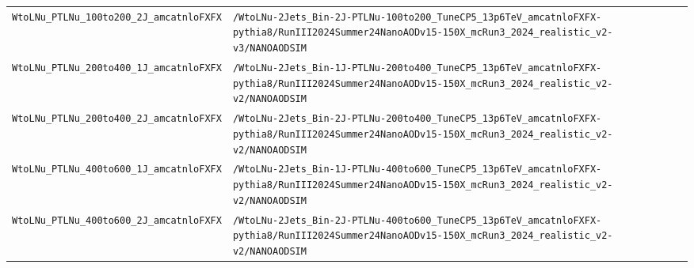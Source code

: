 \begin{longtable}{@{}>{\RaggedRight\arraybackslash}p{} >{\RaggedRight\arraybackslash}p{}@{}}
\addlinespace[2pt]
\texttt{WtoLNu\_\allowbreak{}PTLNu\_\allowbreak{}100to200\_\allowbreak{}2J\_\allowbreak{}amcatnloFXFX} & \texttt{/\allowbreak{}WtoLNu-\allowbreak{}2Jets\_\allowbreak{}Bin-\allowbreak{}2J-\allowbreak{}PTLNu-\allowbreak{}100to200\_\allowbreak{}TuneCP5\_\allowbreak{}13p6TeV\_\allowbreak{}amcatnloFXFX-\allowbreak{}pythia8/\allowbreak{}RunIII2024Summer24NanoAODv15-\allowbreak{}150X\_\allowbreak{}mcRun3\_\allowbreak{}2024\_\allowbreak{}realistic\_\allowbreak{}v2-\allowbreak{}v3/\allowbreak{}NANOAODSIM} \\
\addlinespace[2pt]
\texttt{WtoLNu\_\allowbreak{}PTLNu\_\allowbreak{}200to400\_\allowbreak{}1J\_\allowbreak{}amcatnloFXFX} & \texttt{/\allowbreak{}WtoLNu-\allowbreak{}2Jets\_\allowbreak{}Bin-\allowbreak{}1J-\allowbreak{}PTLNu-\allowbreak{}200to400\_\allowbreak{}TuneCP5\_\allowbreak{}13p6TeV\_\allowbreak{}amcatnloFXFX-\allowbreak{}pythia8/\allowbreak{}RunIII2024Summer24NanoAODv15-\allowbreak{}150X\_\allowbreak{}mcRun3\_\allowbreak{}2024\_\allowbreak{}realistic\_\allowbreak{}v2-\allowbreak{}v2/\allowbreak{}NANOAODSIM} \\
\addlinespace[2pt]
\texttt{WtoLNu\_\allowbreak{}PTLNu\_\allowbreak{}200to400\_\allowbreak{}2J\_\allowbreak{}amcatnloFXFX} & \texttt{/\allowbreak{}WtoLNu-\allowbreak{}2Jets\_\allowbreak{}Bin-\allowbreak{}2J-\allowbreak{}PTLNu-\allowbreak{}200to400\_\allowbreak{}TuneCP5\_\allowbreak{}13p6TeV\_\allowbreak{}amcatnloFXFX-\allowbreak{}pythia8/\allowbreak{}RunIII2024Summer24NanoAODv15-\allowbreak{}150X\_\allowbreak{}mcRun3\_\allowbreak{}2024\_\allowbreak{}realistic\_\allowbreak{}v2-\allowbreak{}v2/\allowbreak{}NANOAODSIM} \\
\addlinespace[2pt]
\texttt{WtoLNu\_\allowbreak{}PTLNu\_\allowbreak{}400to600\_\allowbreak{}1J\_\allowbreak{}amcatnloFXFX} & \texttt{/\allowbreak{}WtoLNu-\allowbreak{}2Jets\_\allowbreak{}Bin-\allowbreak{}1J-\allowbreak{}PTLNu-\allowbreak{}400to600\_\allowbreak{}TuneCP5\_\allowbreak{}13p6TeV\_\allowbreak{}amcatnloFXFX-\allowbreak{}pythia8/\allowbreak{}RunIII2024Summer24NanoAODv15-\allowbreak{}150X\_\allowbreak{}mcRun3\_\allowbreak{}2024\_\allowbreak{}realistic\_\allowbreak{}v2-\allowbreak{}v2/\allowbreak{}NANOAODSIM} \\
\addlinespace[2pt]
\texttt{WtoLNu\_\allowbreak{}PTLNu\_\allowbreak{}400to600\_\allowbreak{}2J\_\allowbreak{}amcatnloFXFX} & \texttt{/\allowbreak{}WtoLNu-\allowbreak{}2Jets\_\allowbreak{}Bin-\allowbreak{}2J-\allowbreak{}PTLNu-\allowbreak{}400to600\_\allowbreak{}TuneCP5\_\allowbreak{}13p6TeV\_\allowbreak{}amcatnloFXFX-\allowbreak{}pythia8/\allowbreak{}RunIII2024Summer24NanoAODv15-\allowbreak{}150X\_\allowbreak{}mcRun3\_\allowbreak{}2024\_\allowbreak{}realistic\_\allowbreak{}v2-\allowbreak{}v2/\allowbreak{}NANOAODSIM} \\

\end{longtable}
